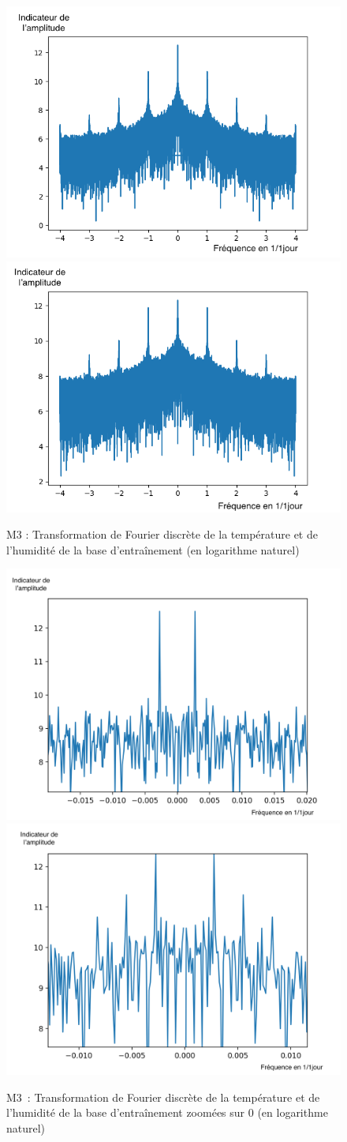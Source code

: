 \documentclass[11pt,a4paper]{article}
\begin{document}
\begin{figure} [!h]
\centering
\includegraphics[width=0.48 \textwidth]{./imagesTIPE/fftT.png}\quad
\includegraphics[width=0.48 \textwidth]{./imagesTIPE/fftH.png}
\caption{\label{fig:ffta} M3 : Transformation de Fourier discrète de la température et de l'humidité de la base d'entraînement (en logarithme naturel)}
\end{figure}
\begin{figure} [!h]
\centering
\includegraphics[width=0.48 \textwidth]{./imagesTIPE/fftTZ.png}\quad
\includegraphics[width=0.48 \textwidth]{./imagesTIPE/fftHZ.png}
\caption{\label{fig:fftz} M3~: Transformation de Fourier discrète de la température et de l'humidité de la base d'entraînement zoomées sur 0 (en logarithme naturel) }
\end{figure}
\end{document}
